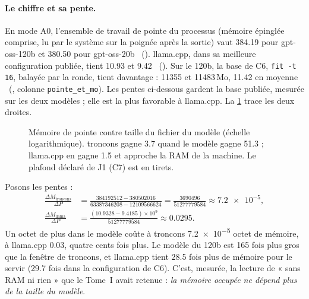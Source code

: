 \paragraph{Le chiffre et sa pente.} En mode A0, l'ensemble de travail de pointe du processus (mémoire épinglée comprise, lu par le système sur la poignée après la sortie) vaut \SI{384.19}{\Mo} pour gpt-oss-120b et \SI{380.50}{\Mo} pour gpt-oss-20b \mes~(). llama.cpp, dans sa meilleure configuration publiée, tient \SI{10.93}{\Go} et \SI{9.42}{\Go} \mes~(). Sur le 120b, la base de C6, \texttt{fit -t 16}, balayée par la ronde, tient davantage : \num{11355} et \num{11483}\,Mo, \SI{11.42}{\Go} en moyenne \mes~(, colonne \texttt{pointe\_et\_mo}). Les pentes ci-dessous gardent la base publiée, mesurée sur les deux modèles ; elle est la plus favorable à llama.cpp. La \cref{t2res-fig:memoire} trace les deux droites.

\begin{figure}[ht]
\centering
\GrapheResMemoire
\caption[Mémoire de pointe contre taille du modèle]{Mémoire de pointe contre taille du fichier du modèle (échelle logarithmique). troncons gagne \SI{3.7}{\Mo} quand le modèle gagne \SI{51.3}{\Go} ; llama.cpp en gagne \SI{1.5}{\Go} et approche la RAM de la machine. Le plafond déclaré de J1 (C7) est en tirets.}
\label{t2res-fig:memoire}
\end{figure}

Posons les pentes \calc :
\begin{align*}
\frac{\Delta M_{\text{troncons}}}{\Delta P} &= \frac{\num{384192512} - \num{380502016}}{\num{63387346208} - \num{12109566624}} = \frac{\num{3690496}}{\num{51277779584}} \approx \num{7.2e-5},\\[2pt]
\frac{\Delta M_{\text{llama}}}{\Delta P} &= \frac{(\num{10.9328} - \num{9.4185}) \times 10^{9}}{\num{51277779584}} \approx \num{0.0295}.
\end{align*}
Un octet de plus dans le modèle coûte à troncons \num{7.2e-5} octet de mémoire, à llama.cpp \num{0.03}, quatre cents fois plus. Le modèle du 120b est \num{165} fois plus gros que la fenêtre de troncons, et llama.cpp tient \num{28.5} fois plus de mémoire pour le servir (\num{29.7} fois dans la configuration de C6). C'est, mesurée, la lecture de « sans RAM ni rien » que le Tome~I avait retenue : \emph{la mémoire occupée ne dépend plus de la taille du modèle}.

